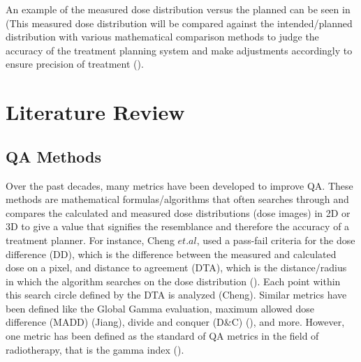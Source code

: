 \documentclass[12pt]{article}
\begin{document}
An example of the measured dose distribution versus the planned can be seen in (This measured dose distribution will be compared against the intended/planned distribution with various mathematical comparison methods to judge the accuracy of the treatment planning system and make adjustments accordingly to ensure precision of treatment (\textcite{Low}).

\section{Literature Review}
\subsection{QA Methods}
Over the past decades, many metrics have been developed to improve QA. These methods are mathematical formulas/algorithms that often searches through and compares the calculated and measured dose distributions (dose images) in 2D or 3D to give a value that signifies the resemblance and therefore the accuracy of a treatment planner. For instance, Cheng $et. al$, used a pass-fail criteria for the dose difference (DD), which is the difference between the measured and calculated dose on a pixel, and distance to agreement (DTA), which is the distance/radius in which the algorithm searches on the dose distribution (\textcite{Cheng}). Each point within this search circle defined by the DTA is analyzed (Cheng). Similar metrics have been defined like the Global Gamma evaluation, maximum allowed dose difference (MADD) (Jiang), divide and conquer (D\&C) (\textcite{Stojadinovic}), and more. However, one metric has been defined as the standard of QA metrics in the field of radiotherapy, that is the gamma index (\textcite{Low}).
\end{document}

